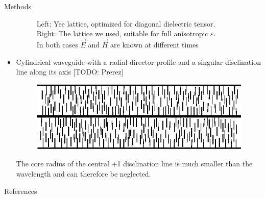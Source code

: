 \documentclass{beamer}
\newlength{\wideitemsep}
\let\olditem\item
\renewcommand{\item}{\setlength{\itemsep}{\wideitemsep}\olditem}
\newcommand{\blockpadding}{
  \rule[-0.6ex]{0pt}{2.5ex}
}
\begin{document}
\begin{columns}[t]
\begin{column}{.36\textwidth}
\begin{block}{\blockpadding Methods}
\begin{itemize}
\begin{figure}[h]
{}
\label{fig:lattice}
\caption{{\color{dark} Left:} Yee lattice, optimized for diagonal dielectric tensor. \\{\color{dark} Right:} The lattice we used, suitable for full anisotropic $\varepsilon$. \\In both cases $\vec E$ and $\vec H$ are known at different times}
\end{figure}

\item Cylindrical waveguide with a radial director profile and a singular disclination line along its axis [TODO: Prerez] \\
\begin{figure}[h]
\centering
\includegraphics[width=.5\textwidth]{../Magisterij/Slike/director-profile-radial}
\end{figure}
The core radius of the central +1 disclination line is much smaller than the wavelength and can therefore be neglected. 

 \end{itemize}
 \end{block}
 
 \begin{block}{\blockpadding References}
  
 \end{block}


 \end{column}
 

\end{columns}
\end{document}
